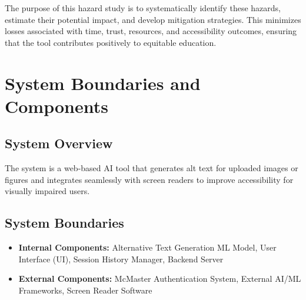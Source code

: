 \documentclass{article}
\begin{document}
The purpose of this hazard study is to systematically identify these hazards, estimate their potential impact, and develop mitigation strategies. This minimizes losses associated with time, trust, resources, and accessibility outcomes, ensuring that the tool contributes positively to equitable education.

\section{System Boundaries and Components}

\subsection{System Overview}
The system is a web-based AI tool that generates alt text
for uploaded images or figures
and integrates seamlessly with screen readers to improve accessibility for
visually impaired users.
\subsection{System Boundaries}
\begin{itemize}
    \item \textbf{Internal Components:} Alternative Text Generation ML Model, User Interface (UI), Session History Manager, Backend Server
    \item \textbf{External Components:} McMaster Authentication System, External AI/ML Frameworks, Screen Reader Software
\end{itemize}
\end{document}
